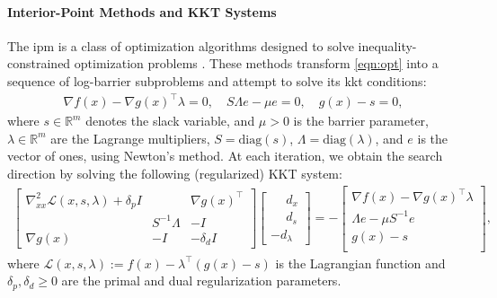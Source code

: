 \documentclass{article}
\begin{document}
\paragraph{Interior-Point Methods and KKT Systems}  
The \gls*{ipm} is a class of optimization algorithms designed to solve inequality-constrained optimization problems \cite{nocedalNumericalOptimization2006}. These methods transform \cref{eqn:opt} into a sequence of log-barrier subproblems and attempt to solve its \gls*{kkt} conditions:
\begin{align}\label{eqn:kkt}
  \nabla f(x) - \nabla g(x)^\top \lambda = 0, \quad
  S \Lambda e - \mu e = 0, \quad
  g(x) - s = 0,
\end{align}
where $s \in \mathbb{R}^m$ denotes the slack variable, and $\mu > 0$ is the barrier parameter, $\lambda \in \mathbb{R}^m$ are the Lagrange multipliers, $S = \text{diag}(s)$, $\Lambda = \text{diag}(\lambda)$, and $e$ is the vector of ones, using Newton's method.
At each iteration, we obtain the search direction by solving the following (regularized) KKT system:
\begin{align}\label{eqn:kkt_system}
  \begin{bmatrix}
    \nabla^2_{x x} \mathcal{L}(x,s,\lambda) + \delta_p I & & \nabla g(x)^\top
    \\ & S^{-1}\Lambda &  -I
    \\ \nabla g(x) & -I &  - \delta_d I
  \end{bmatrix}
  \begin{bmatrix}
    \phantom{-}d_x \\
    \phantom{-}d_s \\
    -d_\lambda
  \end{bmatrix} =
  -\begin{bmatrix}
    \nabla f(x) - \nabla g(x)^\top \lambda\\
     \Lambda e - \mu S^{-1}e \\
    g(x) - s\\
  \end{bmatrix},
\end{align}
where $\mathcal{L}(x,s,\lambda) := f(x) - \lambda^\top (g(x)-s)$ is the Lagrangian function and $\delta_p, \delta_d \geq 0$ are the primal and dual regularization parameters.
\end{document}

